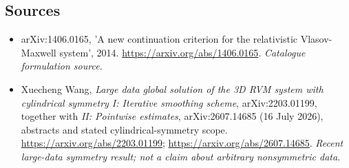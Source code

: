 \documentclass[11pt,a4paper]{article}
\begin{document}
\subsection{Sources}
\begin{itemize}\raggedright
\item[\textnormal{[S1]}]\hypertarget{source:214:1}{} arXiv:1406.0165, 'A new continuation criterion for the relativistic Vlasov-Maxwell system', 2014.
\url{https://arxiv.org/abs/1406.0165}.
{\small\textit{Catalogue formulation source.}}
\item[\textnormal{[E1]}]\hypertarget{extra:214:1}{} Xuecheng Wang,
\emph{Large data global solution of the 3D RVM system with cylindrical symmetry I:
Iterative smoothing scheme}, arXiv:2203.01199, together with
\emph{II: Pointwise estimates}, arXiv:2607.14685 (16 July 2026), abstracts
and stated cylindrical-symmetry scope.
\url{https://arxiv.org/abs/2203.01199};
\url{https://arxiv.org/abs/2607.14685}.
{\small\textit{Recent large-data symmetry result; not a claim about arbitrary nonsymmetric data.}}
\end{itemize}
\end{document}
